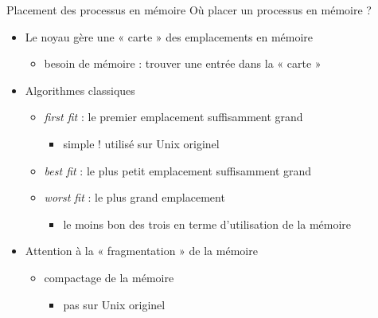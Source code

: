 \begin {frame} {Placement des processus en mémoire}
    Où placer un processus en mémoire ?

    \begin {itemize}
	\item Le noyau gère une « carte » des emplacements en mémoire
	    \begin {itemize}
		\item besoin de mémoire : trouver une entrée dans la « carte »
	    \end {itemize}
	\item Algorithmes classiques
	    \begin {itemize}
		\item \textit {first fit} : le premier
		    emplacement suffisamment grand
		    \begin {itemize}
			\item simple ! utilisé sur Unix originel
		    \end {itemize}
		\item \textit {best fit} : le plus petit
		    emplacement suffisamment grand
		\item \textit {worst fit} : le plus grand
		    emplacement
		    \begin {itemize}
			\item le moins bon des trois en terme
			    d'utilisation de la mémoire
		    \end {itemize}
	    \end {itemize}
	\item Attention à la « fragmentation » de la mémoire
	    \begin {itemize}
		\item compactage de la mémoire
		    \begin {itemize}
			\item pas sur Unix originel
		    \end {itemize}
	    \end {itemize}
    \end {itemize}
\end {frame}

